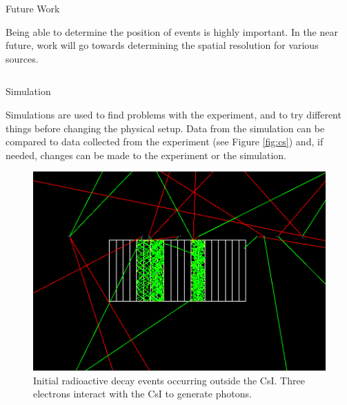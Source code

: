 \documentclass[final]{beamer}
\newlength{\onecolwid}
\newlength{\twocolwid}
\begin{document}
\begin{frame}[t]
\begin{columns}[t]
\begin{column}{\twocolwid}
\begin{columns}[t,totalwidth=\twocolwid]
\begin{column}{\onecolwid}
\end{column} %

\end{columns} %


\begin{alertblock}{Future Work}

Being able to determine the position of events is highly important. In the near future, work will go towards determining the spatial resolution for various sources. 

\end{alertblock} 


\begin{columns}[t,totalwidth=\twocolwid] %

\begin{column}{\onecolwid} %


\begin{block}{Simulation}

Simulations are used to find problems with the experiment, and to try different things before changing the physical setup. Data from the simulation can be compared to data collected from the experiment (see Figure \ref{fig:cs}) and, if needed, changes can be made to the experiment or the simulation.

\hspace{1cm}
\begin{figure}
\includegraphics[width=0.8\linewidth]{events.png}
\caption{Initial radioactive decay events occurring outside the CsI. Three electrons interact with the CsI to generate photons.}
\end{figure}


\end{block}
\end{column}
\end{columns}
\end{column}
\end{columns}
\end{frame}
\end{document}
